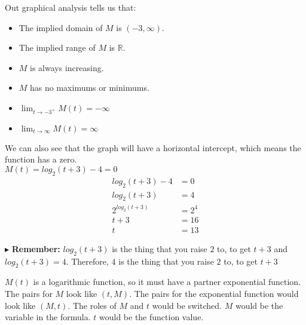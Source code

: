 \documentclass{ximera}
\begin{document}
\begin{example}
\begin{image}
\end{image}




Out graphical analysis tells us that:

\begin{itemize}
\item The implied domain of $M$ is $(-3,\infty)$.
\item The implied range of $M$ is $\mathbb{R}$.
\item $M$ is always increasing.
\item $M$ has no maximums or minimums.
\item $\lim_{t \to -3^+} M(t) = -\infty$
\item $\lim_{t \to \infty} M(t) = \infty$
\end{itemize}




We can also see that the graph will have a horizontal intercept, which means the function has a zero. \\


$M(t) = log_2(t+3) - 4 = 0$ \\


\begin{align*}
log_2(t+3) - 4 & = 0 \\
log_2(t+3) & = 4 \\
2^{log_2(t+3)} & = 2^4 \\
t+3 & = 16 \\
t & = 13
\end{align*}


$\blacktriangleright$ \textbf{Remember:} $log_2(t+3)$ is the thing that you raise $2$ to, to get $t+3$ and $log_2(t+3) = 4$.  Therefore, $4$ is the thing that you raise $2$ to, to get $t+3$











\end{example}



$M(t)$ is a logarithmic function, so it must have a partner exponential function.  The pairs for $M$ look like $(t, M)$. The pairs for the exponential function would look like $(M, t)$.  The roles of $M$ and $t$ would be switched. $M$ would be the variable in the formula. $t$ would be the function value.
\end{document}
